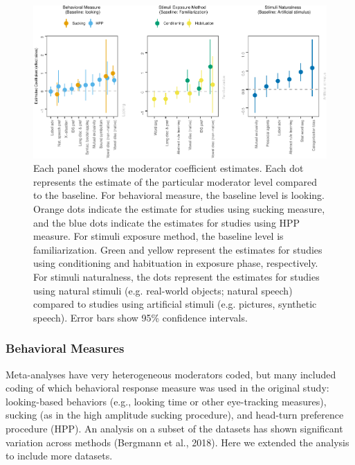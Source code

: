 \documentclass[10pt, letterpaper]{article}
\newenvironment{CodeChunk}{}{}
\begin{document}
\begin{CodeChunk}
\begin{figure}[t!]

{\centering \includegraphics{figs/mod_plot-1} 

}

\caption[Each panel shows the moderator coefficient estimates]{Each panel shows the moderator coefficient estimates. Each dot represents the estimate of the particular moderator level compared to the baseline. For behavioral measure, the baseline level is looking. Orange dots indicate the estimate for studies using sucking measure, and the blue dots indicate the estimates for studies using HPP measure. For stimuli exposure method, the baseline level is familiarization. Green and yellow represent the estimates for studies using conditioning and habituation in exposure phase, respectively. For stimuli naturalness, the dots represent the estimates for studies using natural stimuli (e.g. real-world objects; natural speech) compared to studies using artificial stimuli (e.g. pictures, synthetic speech). Error bars show 95\% confidence intervals.}\label{fig:mod_plot}
\end{figure}
\end{CodeChunk}

\hypertarget{behavioral-measures}{%
\subsubsection{Behavioral Measures}\label{behavioral-measures}}

Meta-analyses have very heterogeneous moderators coded, but many
included coding of which behavioral response measure was used in the
original study: looking-based behaviors (e.g., looking time or other
eye-tracking measures), sucking (as in the high amplitude sucking
procedure), and head-turn preference procedure (HPP). An analysis on a
subset of the datasets has shown significant variation across methods
(Bergmann et al., 2018). Here we extended the analysis to include more
datasets.
\end{document}
